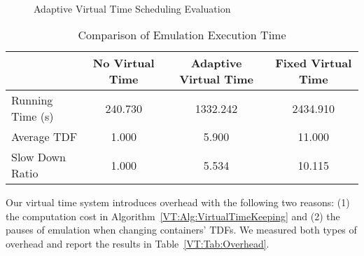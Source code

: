 \begin{figure}[t]
    \centering
    \\
    \caption{Adaptive Virtual Time Scheduling Evaluation}
    \label{VT:Fig:Adaptive}
\end{figure}

\begin{table*}[t]
    \centering
    \caption{Comparison of Emulation Execution Time}
    \begin{tabular}{lccc} 
        \hline
        \hline
        & No Virtual Time & Adaptive Virtual Time & Fixed Virtual Time \\ 
        \hline
        Running Time (s)  & 240.730 & 1332.242 & 2434.910 \\ 
        Average TDF & 1.000 & 5.900 & 11.000 \\ 
        Slow Down Ratio & 1.000 & 5.534 & 10.115 \\
        \hline
    \end{tabular}
    \label{VT:Tab:CompareRunTime}
\end{table*}

Our virtual time system introduces overhead with the following two reasons:
(1) the computation cost in Algorithm~\ref{VT:Alg:VirtualTimeKeeping} and
(2) the pauses of emulation when changing containers' TDFs.
We measured both types of overhead and report the results in Table~\ref{VT:Tab:Overhead}.

